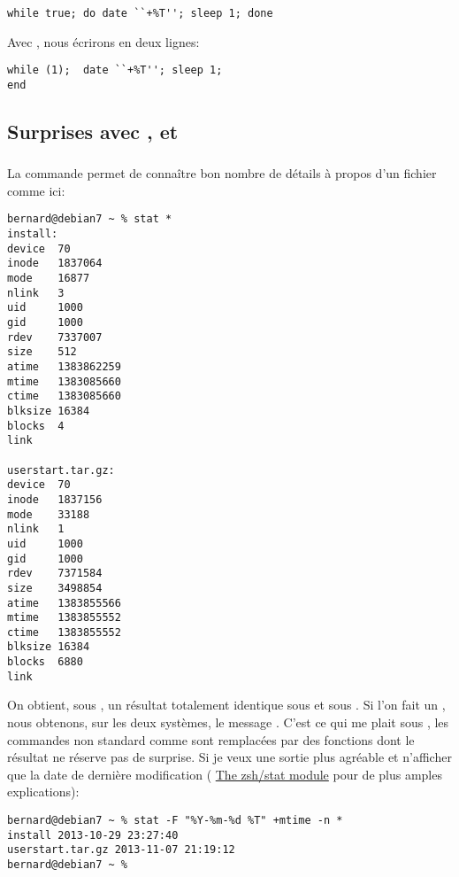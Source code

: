 \begin{lstlisting}[caption=une boucle while]
while true; do date ``+%T''; sleep 1; done
\end{lstlisting}

Avec \tcsh{}, nous écrirons en deux lignes:
\begin{lstlisting}[caption=la même pour tcsh]
while (1);  date ``+%T''; sleep 1;
end
\end{lstlisting}

\subsection{Surprises avec ,  et }

\subsubsection{}
La commande  permet de connaître bon nombre de détails à propos d'un fichier comme ici:

\begin{lstlisting}[caption=la commande stat depuis zsh]
bernard@debian7 ~ % stat *
install:
device  70
inode   1837064
mode    16877
nlink   3
uid     1000
gid     1000
rdev    7337007
size    512
atime   1383862259
mtime   1383085660
ctime   1383085660
blksize 16384
blocks  4
link

userstart.tar.gz:
device  70
inode   1837156
mode    33188
nlink   1
uid     1000
gid     1000
rdev    7371584
size    3498854
atime   1383855566
mtime   1383855552
ctime   1383855552
blksize 16384
blocks  6880
link
\end{lstlisting}

On obtient, sous \zsh{}, un résultat totalement identique sous \netbsd{} et sous \linux{}.  Si l'on fait un , nous obtenons, sur les deux systèmes, le message . C'est ce qui me plait sous \zsh{}, les commandes non standard comme  sont remplacées par des fonctions dont le résultat ne réserve pas de surprise.  Si je veux une sortie plus agréable et n'afficher que la date de dernière modification (\cf{} \href{http://zsh.sourceforge.net/Doc/Release/Zsh-Modules.html#The-zsh_002fstat-Module}{The zsh/stat module} pour de plus amples explications):

\begin{lstlisting}[caption=stat depuis zsh sous Debian]
bernard@debian7 ~ % stat -F "%Y-%m-%d %T" +mtime -n *
install 2013-10-29 23:27:40
userstart.tar.gz 2013-11-07 21:19:12
bernard@debian7 ~ %
\end{lstlisting}

